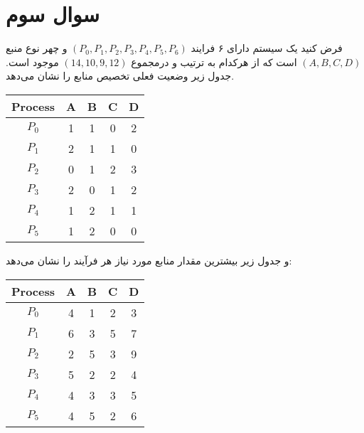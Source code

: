 \section{سوال سوم}


فرض کنید یک سیستم دارای ۶ فرایند $ (P_0, P_1, P_2, P_3, P_4, P_5, P_6) $ و چهر نوع منبع  $(A, B, C, D)$ است که از هرکدام به ترتیب و درمجموع $ (14, 10, 9, 12) $ موجود است. جدول زیر وضعیت فعلی تخصیص منابع را نشان می‌دهد.



\begin{center}
	\begin{tabular}{||c|c|c|c|c||}
		\hline 
		Process & A & B & C & D\\
		\hline \hline
		$P_0$ & 1 & 1 & 0 & 2 \\
		$P_1$ & 2 & 1 & 1 & 0 \\
		$P_2$ & 0 & 1 & 2 & 3 \\
		$P_3$ & 2 & 0 & 1 & 2 \\
		$P_4$ & 1 & 2 & 1 & 1 \\
		$P_5$ & 1 & 2 & 0 & 0 \\
		\hline
	\end{tabular}
\end{center}


و جدول زیر بیشترین مقدار منابع مورد نیاز هر فرآیند را نشان می‌دهد:

\begin{center}
	\begin{tabular}{||c|c|c|c|c||}
		\hline 
		Process & A & B & C & D\\
		\hline \hline
		$P_0$ & 4 & 1 & 2 & 3 \\
		$P_1$ & 6 & 3 & 5 & 7 \\
		$P_2$ & 2 & 5 & 3 & 9 \\
		$P_3$ & 5 & 2 & 2 & 4 \\
		$P_4$ & 4 & 3 & 3 & 5 \\
		$P_5$ & 4 & 5 & 2 & 6 \\
		\hline
	\end{tabular}
\end{center}



